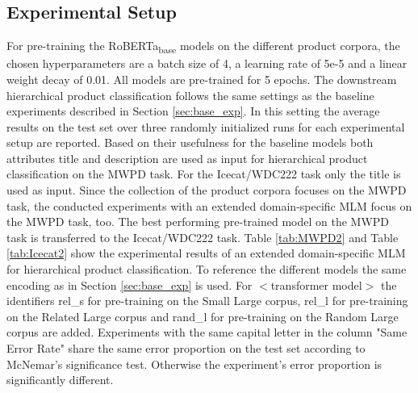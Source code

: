 \documentclass[11pt,dvipdfm]{article}
\begin{document}
\subsection{Experimental Setup}

For pre-training the RoBERTa\textsubscript{base} models on the different product corpora, the chosen hyperparameters are a batch size of 4, a learning rate of 5e-5 and a linear weight decay of 0.01.
All models are pre-trained for 5 epochs.
The downstream hierarchical product classification follows the same settings as the baseline experiments described in Section \ref{sec:base_exp}.
In this setting the average results on the test set over three randomly initialized runs for each experimental setup are reported.
Based on their usefulness for the baseline models both attributes title and description are used as input for hierarchical product classification on the \ac{MWPD} task.
For the Icecat/WDC222 task only the title is used as input.
Since the collection of the product corpora focuses on the \ac{MWPD} task, the conducted experiments with an extended domain-specific \ac{MLM} focus on the \ac{MWPD} task, too.
The best performing pre-trained model on the \ac{MWPD} task is transferred to the Icecat/WDC222 task. 
Table \ref{tab:MWPD2} and Table \ref{tab:Icecat2} show the experimental results of an extended domain-specific \ac{MLM} for hierarchical product classification.
To reference the different models the same encoding as in Section \ref{sec:base_exp} is used.
For $<$transformer model$>$ the identifiers rel\_s for pre-training on the Small Large corpus, rel\_l for pre-training on the Related Large corpus and rand\_l for pre-training on the Random Large corpus are added.
Experiments with the same capital letter in the column "Same Error Rate" share the same error proportion on the test set according to McNemar's significance test.
Otherwise the experiment's error proportion is significantly different.
\end{document}
